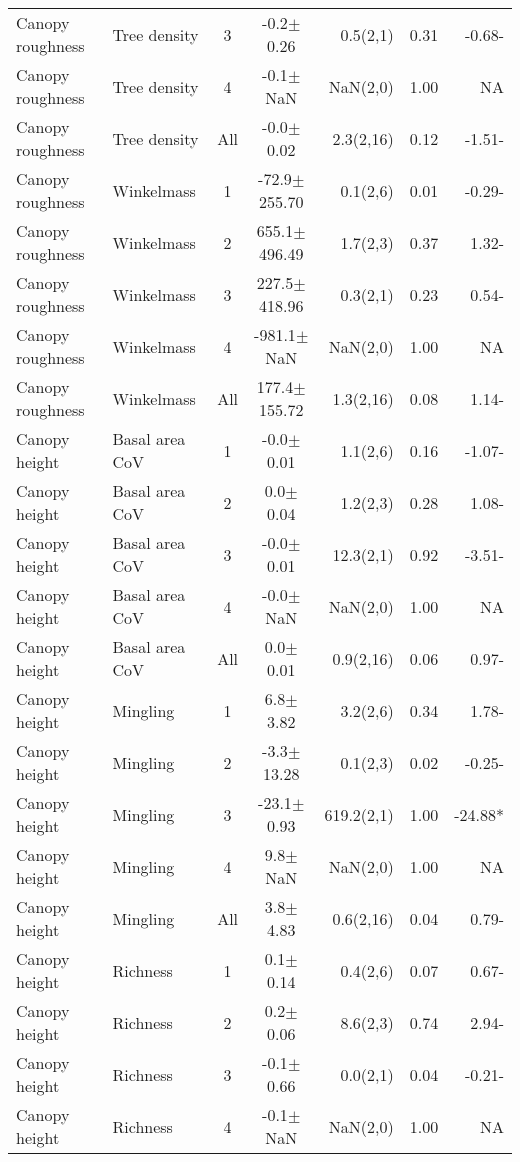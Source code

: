 \begin{longtable}{llcS[table-format=5.1(4.2)]rS[table-format=1.2]r}
  Canopy roughness & Tree density & 3 & -0.2$\pm$0.26 & 0.5(2,1) & 0.31 & -0.68- \\ 
  Canopy roughness & Tree density & 4 & -0.1$\pm$NaN & NaN(2,0) & 1.00 & NA \\ 
  Canopy roughness & Tree density & All & -0.0$\pm$0.02 & 2.3(2,16) & 0.12 & -1.51- \\ 
   \midrule
Canopy roughness & Winkelmass & 1 & -72.9$\pm$255.70 & 0.1(2,6) & 0.01 & -0.29- \\ 
  Canopy roughness & Winkelmass & 2 & 655.1$\pm$496.49 & 1.7(2,3) & 0.37 & 1.32- \\ 
  Canopy roughness & Winkelmass & 3 & 227.5$\pm$418.96 & 0.3(2,1) & 0.23 & 0.54- \\ 
  Canopy roughness & Winkelmass & 4 & -981.1$\pm$NaN & NaN(2,0) & 1.00 & NA \\ 
  Canopy roughness & Winkelmass & All & 177.4$\pm$155.72 & 1.3(2,16) & 0.08 & 1.14- \\ 
   \midrule
Canopy height & Basal area CoV & 1 & -0.0$\pm$0.01 & 1.1(2,6) & 0.16 & -1.07- \\ 
  Canopy height & Basal area CoV & 2 & 0.0$\pm$0.04 & 1.2(2,3) & 0.28 & 1.08- \\ 
  Canopy height & Basal area CoV & 3 & -0.0$\pm$0.01 & 12.3(2,1) & 0.92 & -3.51- \\ 
  Canopy height & Basal area CoV & 4 & -0.0$\pm$NaN & NaN(2,0) & 1.00 & NA \\ 
  Canopy height & Basal area CoV & All & 0.0$\pm$0.01 & 0.9(2,16) & 0.06 & 0.97- \\ 
   \midrule
Canopy height & Mingling & 1 & 6.8$\pm$3.82 & 3.2(2,6) & 0.34 & 1.78- \\ 
  Canopy height & Mingling & 2 & -3.3$\pm$13.28 & 0.1(2,3) & 0.02 & -0.25- \\ 
  Canopy height & Mingling & 3 & -23.1$\pm$0.93 & 619.2(2,1) & 1.00 & -24.88* \\ 
  Canopy height & Mingling & 4 & 9.8$\pm$NaN & NaN(2,0) & 1.00 & NA \\ 
  Canopy height & Mingling & All & 3.8$\pm$4.83 & 0.6(2,16) & 0.04 & 0.79- \\ 
   \midrule
Canopy height & Richness & 1 & 0.1$\pm$0.14 & 0.4(2,6) & 0.07 & 0.67- \\ 
  Canopy height & Richness & 2 & 0.2$\pm$0.06 & 8.6(2,3) & 0.74 & 2.94- \\ 
  Canopy height & Richness & 3 & -0.1$\pm$0.66 & 0.0(2,1) & 0.04 & -0.21- \\ 
  Canopy height & Richness & 4 & -0.1$\pm$NaN & NaN(2,0) & 1.00 & NA \\ 

\end{longtable}
